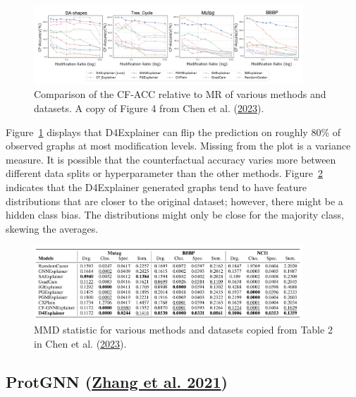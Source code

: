 \documentclass[
  11pt,
  letterpaper,
]{article}
\begin{document}
\begin{figure}

{\centering \includegraphics[width=0.9\textwidth,height=\textheight]{figures/D4-CF-Plot.png}

}

\caption{\label{fig-D4-CF-ACC}Comparison of the CF-ACC relative to MR of
various methods and datasets. A copy of Figure 4 from Chen et al.
(\protect\hyperlink{ref-Chen_Wu_Gupta_Ying_2023}{2023}).}

\end{figure}

Figure~\ref{fig-D4-CF-ACC} displays that D4Explainer can flip the
prediction on roughly 80\% of observed graphs at most modification
levels. Missing from the plot is a variance measure. It is possible that
the counterfactual accuracy varies more between different data splits or
hyperparameter than the other methods. Figure~\ref{fig-D4-MMD} indicates
that the D4Explainer generated graphs tend to have feature distributions
that are closer to the original dataset; however, there might be a
hidden class bias. The distributions might only be close for the
majority class, skewing the averages.

\begin{figure}

{\centering \includegraphics[width=0.9\textwidth,height=\textheight]{figures/D4-MMD-Table.png}

}

\caption{\label{fig-D4-MMD}MMD statistic for various methods and
datasets copied from Table 2 in Chen et al.
(\protect\hyperlink{ref-Chen_Wu_Gupta_Ying_2023}{2023}).}

\end{figure}

\hypertarget{protgnn-zhang_liu_wang_lu_lee_2021}{%
\subsection{\texorpdfstring{ProtGNN
(\protect\hyperlink{ref-Zhang_Liu_Wang_Lu_Lee_2021}{Zhang et al.
2021})}{ProtGNN (Zhang et al. 2021)}}\label{protgnn-zhang_liu_wang_lu_lee_2021}}
\end{document}
